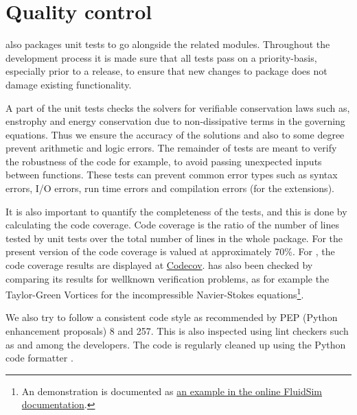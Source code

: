 \documentclass{../jors}
\begin{document}
\section*{Quality control}


 also packages unit tests to go alongside the related
modules. Throughout the development process it is made sure that all tests pass
on a priority-basis, especially prior to a release, to ensure that new changes
to package does not damage existing functionality.

A part of the unit tests checks the solvers for verifiable conservation laws
such as, enstrophy and energy conservation due to non-dissipative terms in the
governing equations. Thus we ensure the accuracy of the solutions and also to
some degree prevent arithmetic and logic errors. The remainder of tests are
meant to verify the robustness of the code for example, to avoid passing
unexpected inputs between functions. These tests can prevent common error
types such as syntax errors, I/O errors, run time errors and compilation errors
(for the extensions).

It is also important to quantify the completeness of the tests, and this
is done by calculating the code coverage. Code coverage is the ratio of the
number of lines tested by unit tests over the total number of lines in the whole
package. For the present version of  the code coverage is
valued at approximately 70\%.
%
For , the code coverage results are displayed at
\href{https://codecov.io/bb/fluiddyn/fluidsim}{Codecov}.
%
 has also been checked by comparing its results for wellknown
verification problems, as for example the Taylor-Green Vortices for the
incompressible Navier-Stokes equations\footnote{An demonstration is documented
  as \href{https://fluidsim.readthedocs.io/en/latest/examples.html}{an example
  in the online FluidSim documentation}.
}.

We also try to follow a consistent code style as recommended by PEP (Python
enhancement proposals) 8 and 257. This is also inspected using lint
checkers such as  and  among the
developers. The code is regularly cleaned up using the Python code formatter
.
\end{document}
